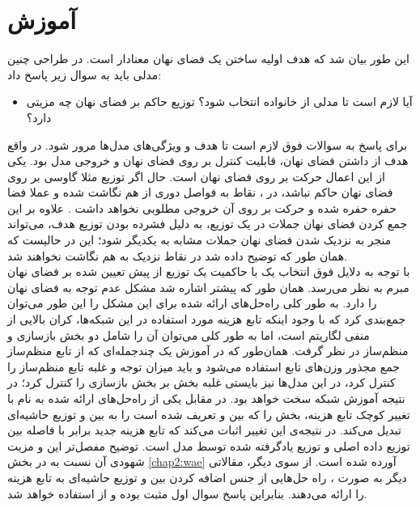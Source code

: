 \section{آموزش \autoencoder{}} \label{chap3:wae_training}
این طور بیان شد که هدف اولیه ساختن یک فضای نهان معنادار است. در طراحی چنین مدلی باید به سوال زیر پاسخ داد:
\begin{itemize}
	\item
	      آیا لازم است تا مدلی از خانواده \vae{}  انتخاب شود؟ توزیع حاکم بر فضای نهان چه مزیتی دارد؟
\end{itemize}
برای پاسخ به سوالات فوق لازم است تا هدف و ویژگی‌های مدل‌ها مرور شود. در واقع هدف از داشتن فضای نهان، قابلیت کنترل بر روی فضای نهان و خروجی مدل بود. یکی از این اعمال حرکت بر روی فضای نهان است. حال اگر توزیع مثلا گاوسی بر روی فضای نهان حاکم نباشد، در \autoencoder{}، نقاط به فواصل دوری از هم نگاشت شده و عملا فضا حفره حفره شده و حرکت بر روی آن خروجی مطلوبی نخواهد داشت \cite{infovae}. علاوه بر این جمع کردن فضای نهان جملات در یک توزیع، به دلیل فشرده بودن توزیع هدف، می‌تواند منجر به نزدیک شدن فضای نهان جملات مشابه به یکدیگر شود؛ این در حالیست که همان طور که توضیح داده شد در   \autoencoder{} نقاط نزدیک به هم نگاشت نخواهند شد.
\\
با توجه به دلایل فوق انتخاب یک \autoencoder{} با حاکمیت یک توزیع از پیش تعیین شده بر فضای نهان مبرم به نظر می‌رسد. همان طور که پیشتر اشاره شد \vae{} مشکل عدم توجه به فضای نهان را دارد. به طور کلی راه‌حل‌های ارائه شده برای این مشکل را این طور  می‌توان جمع‌بندی کرد که با وجود اینکه تابع هزینه مورد استفاده در این شبکه‌ها، کران بالایی از منفی لگاریتم \likelihood{} است، اما به طور کلی می‌توان آن را شامل دو بخش بازسازی و منظم‌ساز در نظر گرفت. همان‌طور که در آموزش یک چندجمله‌ای که از تابع منظم‌ساز جمع مجذور وزن‌های تابع استفاده می‌شود و باید میزان توجه و غلبه تابع منظم‌ساز را کنترل کرد، در این مدل‌ها نیز بایستی غلبه بخش  بر بخش بازسازی را کنترل کرد؛ در نتیجه آموزش شبکه سخت خواهد بود. در مقابل یکی از راه‌حل‌های ارائه شده به نام \wae{} با تغییر کوچک تابع هزینه، بخش  را که بین \priordist{} و \posteriordist{} تعریف شده است را به  بین \priordist{} و توزیع حاشیه‌ای \posterior{} تبدیل می‌کند. در نتیجه‌ی این تغییر اثبات می‌کند که تابع هزینه جدید برابر با فاصله \wasser{} بین توزیع داده اصلی و توزیع یادگرفته شده توسط مدل است. توضیح مفصل‌تر این \autoencoder{} و مزیت شهودی آن نسبت به \vae{} در بخش \ref{chap2:wae} آورده شده است.
از سوی دیگر، مقالاتی دیگر به صورت \huristic{}، راه حل‌هایی از جنس اضافه کردن  بین \priordist{} و توزیع حاشیه‌ای \posterior{} به تابع هزینه \vae{} را ارائه می‌دهند.  بنابراین پاسخ سوال اول مثبت بوده و از \wae{} استفاده خواهد شد.
